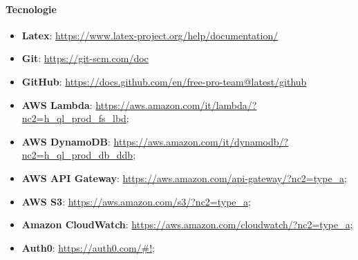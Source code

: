 \paragraph{Tecnologie}
\begin{itemize}
    \item \textbf{Latex}: \url{https://www.latex-project.org/help/documentation/}
    \item \textbf{Git}: \url{https://git-scm.com/doc}
    \item \textbf{GitHub}: \url{https://docs.github.com/en/free-pro-team@latest/github}
    \item \textbf{AWS Lambda}: \url{https://aws.amazon.com/it/lambda/?nc2=h_ql_prod_fs_lbd};
    \item \textbf{AWS DynamoDB}: \url{https://aws.amazon.com/it/dynamodb/?nc2=h_ql_prod_db_ddb};
    \item \textbf{AWS API Gateway}: \url{https://aws.amazon.com/api-gateway/?nc2=type_a};
    \item \textbf{AWS S3}: \url{https://aws.amazon.com/s3/?nc2=type_a};
    \item \textbf{Amazon CloudWatch}: \url{https://aws.amazon.com/cloudwatch/?nc2=type_a};
    \item \textbf{Auth0}: \url{https://auth0.com/#!};
\end{itemize}